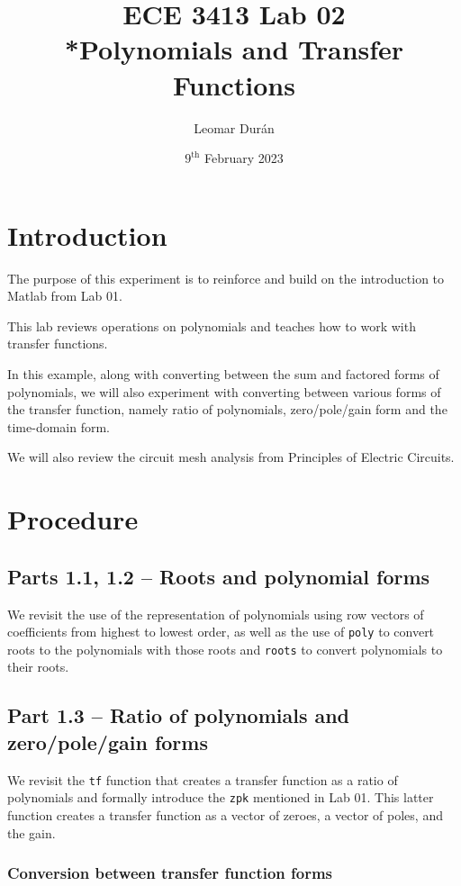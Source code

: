 \documentclass[12pt]{article}
\title{ECE 3413 Lab 02\\*Polynomials and Transfer Functions}
\author{Leomar Dur\'an}
\date{$9^{\text{th}}$ February 2023}
\begin{document}
\maketitle
\newpage

\section{Introduction}

The purpose of this experiment is to reinforce and build on the introduction to Matlab from Lab 01.

This lab reviews operations on polynomials and teaches how to work with transfer functions.

In this example,
along with converting between the sum and factored forms of polynomials,
we will also experiment with converting between various forms of the transfer function,
namely ratio of polynomials, zero/pole/gain form and the time-domain form.

We will also review the circuit mesh analysis from Principles of Electric Circuits.

\section{Procedure}

\subsection{Parts 1.1, 1.2 -- Roots and polynomial forms}

We revisit the use of the representation of polynomials using row vectors of coefficients from highest to lowest order, 
as well as the use of \texttt{poly} to convert roots to the polynomials with those roots and
\texttt{roots} to convert polynomials to their roots.

\subsection{Part 1.3 -- Ratio of polynomials and zero/pole/gain forms}

We revisit the \texttt{tf} function that creates a transfer function as a ratio of polynomials and formally introduce the \texttt{zpk} mentioned in Lab 01. This latter function creates a transfer function as a vector of zeroes, a vector of poles, and the gain.

\subsubsection{Conversion between transfer function forms}
\end{document}
